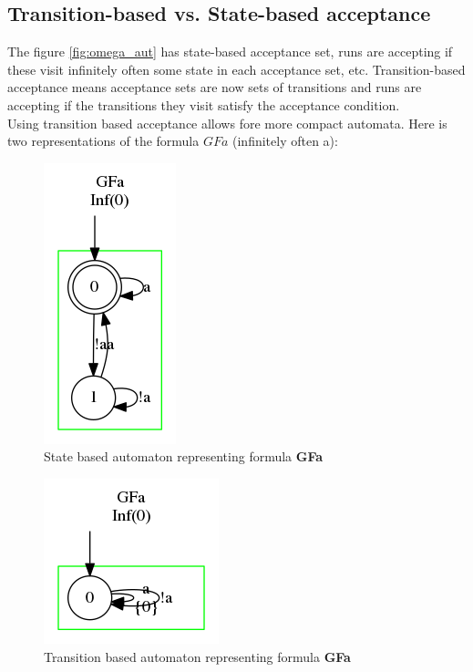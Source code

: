\subsection{Transition-based vs. State-based acceptance}
The figure \ref{fig:omega_aut} has state-based acceptance set, runs are accepting if these visit infinitely
often some state in each acceptance set, etc. Transition-based acceptance means acceptance sets are now
sets of transitions and runs are accepting if the transitions they visit satisfy the acceptance condition.\\

Using transition based acceptance allows fore more compact automata. Here is two representations of the
formula $GFa$ (infinitely often a):

\begin{figure}[H]
 \centering
 \includegraphics[scale=0.8]{img/state_based.png}
 \caption{State based automaton representing formula \textbf{GFa}}
 \label{fig:state_based}
\end{figure}

\begin{figure}[H]
 \centering
 \includegraphics[scale=0.8]{img/trans_based.png}
 \caption{Transition based automaton representing formula \textbf{GFa}}
 \label{fig:transition_based}
\end{figure}


